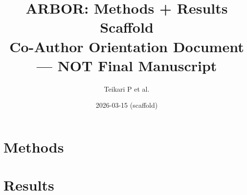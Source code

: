 \documentclass[11pt]{article}
\title{ARBOR: Methods + Results Scaffold\\
{\large Co-Author Orientation Document --- NOT Final Manuscript}}
\author{Teikari P et al.}
\date{2026-03-15 (scaffold)}
\begin{document}
\maketitle
\tableofcontents
\newpage

\section{Methods}














\section{Results}






\end{document}
